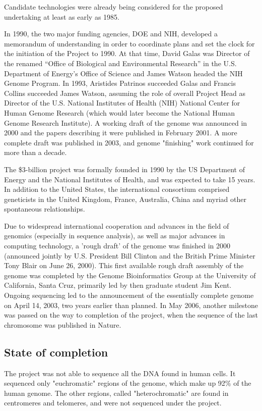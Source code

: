 \documentclass[12pt]{article}
\begin{document}
Candidate technologies were already being considered for the proposed undertaking at least as early as 1985.

In 1990, the two major funding agencies, DOE and NIH, developed a memorandum of understanding in order to coordinate plans and set the clock for the initiation of the Project to 1990. At that time, David Galas was Director of the renamed “Office of Biological and Environmental Research” in the U.S. Department of Energy’s Office of Science and James Watson headed the NIH Genome Program. In 1993, Aristides Patrinos succeeded Galas and Francis Collins succeeded James Watson, assuming the role of overall Project Head as Director of the U.S. National Institutes of Health (NIH) National Center for Human Genome Research (which would later become the National Human Genome Research Institute). A working draft of the genome was announced in 2000 and the papers describing it were published in February 2001. A more complete draft was published in 2003, and genome "finishing" work continued for more than a decade.

The \$3-billion project was formally founded in 1990 by the US Department of Energy and the National Institutes of Health, and was expected to take 15 years. In addition to the United States, the international consortium comprised geneticists in the United Kingdom, France, Australia, China and myriad other spontaneous relationships.

Due to widespread international cooperation and advances in the field of genomics (especially in sequence analysis), as well as major advances in computing technology, a 'rough draft' of the genome was finished in 2000 (announced jointly by U.S. President Bill Clinton and the British Prime Minister Tony Blair on June 26, 2000). This first available rough draft assembly of the genome was completed by the Genome Bioinformatics Group at the University of California, Santa Cruz, primarily led by then graduate student Jim Kent. Ongoing sequencing led to the announcement of the essentially complete genome on April 14, 2003, two years earlier than planned. In May 2006, another milestone was passed on the way to completion of the project, when the sequence of the last chromosome was published in Nature.

\subsection{State of completion}
The project was not able to sequence all the DNA found in human cells. It sequenced only "euchromatic" regions of the genome, which make up 92\% of the human genome. The other regions, called "heterochromatic" are found in centromeres and telomeres, and were not sequenced under the project.
\end{document}
